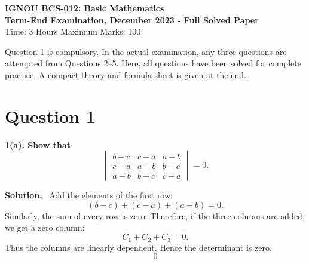\documentclass[11pt,a4paper]{article}
\newcommand{\question}[1]{\vspace{4pt}\begin{tcolorbox}[colback=softblue,colframe=headblue,boxrule=0.6pt,arc=2pt,left=5pt,right=5pt,top=4pt,bottom=4pt]\textbf{#1}\end{tcolorbox}}
\newcommand{\answer}{\textbf{Solution.}~}
\newcommand{\finalans}[1]{\[\boxed{#1}\]}
\begin{document}
\begin{center}
{\Large\bfseries IGNOU BCS-012: Basic Mathematics}\\[2mm]
{\large\bfseries Term-End Examination, December 2023 - Full Solved Paper}\\[1mm]
Time: 3 Hours \quad Maximum Marks: 100\par
\end{center}

\begin{tcolorbox}[colback=softyellow,colframe=orange!70!black,title=How to use this solved paper]
Question 1 is compulsory. In the actual examination, any three questions are attempted from Questions 2--5. Here, all questions have been solved for complete practice. A compact theory and formula sheet is given at the end.
\end{tcolorbox}

\section*{Question 1}

\question{1(a). Show that
\[
\begin{vmatrix}
b-c&c-a&a-b\\
c-a&a-b&b-c\\
a-b&b-c&c-a
\end{vmatrix}=0.
\]}
\answer
Add the elements of the first row:
\[
(b-c)+(c-a)+(a-b)=0.
\]
Similarly, the sum of every row is zero. Therefore, if the three columns are added, we get a zero column:
\[
C_1+C_2+C_3=0.
\]
Thus the columns are linearly dependent. Hence the determinant is zero.
\finalans{0}
\end{document}
